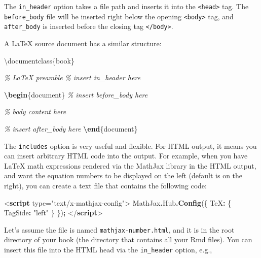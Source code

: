 \documentclass[
  12pt,
]{krantz}
\newenvironment{Shaded}{\begin{snugshade}}{\end{snugshade}}
\newcommand{\AttributeTok}[1]{\textcolor[rgb]{0.13,0.29,0.53}{#1}}
\newcommand{\BuiltInTok}[1]{#1}
\newcommand{\CommentTok}[1]{\textcolor[rgb]{0.56,0.35,0.01}{\textit{#1}}}
\newcommand{\DataTypeTok}[1]{\textcolor[rgb]{0.13,0.29,0.53}{#1}}
\newcommand{\ExtensionTok}[1]{#1}
\newcommand{\FunctionTok}[1]{\textcolor[rgb]{0.13,0.29,0.53}{\textbf{#1}}}
\newcommand{\KeywordTok}[1]{\textcolor[rgb]{0.13,0.29,0.53}{\textbf{#1}}}
\newcommand{\NormalTok}[1]{#1}
\newcommand{\OperatorTok}[1]{\textcolor[rgb]{0.81,0.36,0.00}{\textbf{#1}}}
\newcommand{\OtherTok}[1]{\textcolor[rgb]{0.56,0.35,0.01}{#1}}
\newcommand{\StringTok}[1]{\textcolor[rgb]{0.31,0.60,0.02}{#1}}
\theoremstyle{definition}
\theoremstyle{definition}
\theoremstyle{definition}
\theoremstyle{definition}
\theoremstyle{remark}
\begin{document}
The \texttt{in\_header} option takes a file path and inserts it into the \texttt{\textless{}head\textgreater{}} tag. The \texttt{before\_body} file will be inserted right below the opening \texttt{\textless{}body\textgreater{}} tag, and \texttt{after\_body} is inserted before the closing tag \texttt{\textless{}/body\textgreater{}}.

A LaTeX source document has a similar structure:

\begin{Shaded}
\begin{Highlighting}[]
\BuiltInTok{\textbackslash{}documentclass}\NormalTok{\{}\ExtensionTok{book}\NormalTok{\}}

\CommentTok{\% LaTeX preamble}
\CommentTok{\% insert in\_header here}

\KeywordTok{\textbackslash{}begin}\NormalTok{\{}\ExtensionTok{document}\NormalTok{\}}
\CommentTok{\% insert before\_body here}

\CommentTok{\% body content here}

\CommentTok{\% insert after\_body here}
\KeywordTok{\textbackslash{}end}\NormalTok{\{}\ExtensionTok{document}\NormalTok{\}}
\end{Highlighting}
\end{Shaded}

The \texttt{includes} option is very useful and flexible. For HTML output, it means you can insert arbitrary HTML code into the output. For example, when you have LaTeX math expressions rendered via the MathJax library in the HTML output, and want the equation numbers to be displayed on the left (default is on the right), you can create a text file that contains the following code:

\begin{Shaded}
\begin{Highlighting}[]
\DataTypeTok{\textless{}}\KeywordTok{script}\OtherTok{ type=}\StringTok{"text/x{-}mathjax{-}config"}\DataTypeTok{\textgreater{}}
\NormalTok{MathJax}\OperatorTok{.}\AttributeTok{Hub}\OperatorTok{.}\FunctionTok{Config}\NormalTok{(\{}
  \DataTypeTok{TeX}\OperatorTok{:}\NormalTok{ \{ }\DataTypeTok{TagSide}\OperatorTok{:} \StringTok{"left"}\NormalTok{ \}}
\NormalTok{\})}\OperatorTok{;}
\DataTypeTok{\textless{}/}\KeywordTok{script}\DataTypeTok{\textgreater{}}
\end{Highlighting}
\end{Shaded}

Let's assume the file is named \texttt{mathjax-number.html}, and it is in the root directory of your book (the directory that contains all your Rmd files). You can insert this file into the HTML head via the \texttt{in\_header} option, e.g.,
\end{document}

